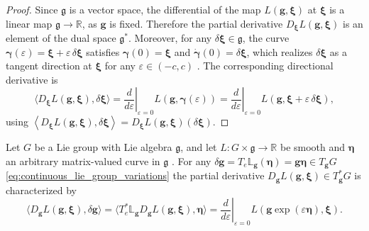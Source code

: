 \begin{proof}
Since $\mathfrak g$ is a vector space, the differential of the map $L(\bm{g},\bm{\xi})$ at $\bm{\xi}$ is a linear map $\mathfrak g\to\mathbb R$, as $\bm{g}$ is fixed. Therefore the partial derivative $D_{\bm{\xi}}L(\bm{g},\bm{\xi})$ is an element of the dual space $\mathfrak g^*$. Moreover, for any $\delta\bm{\xi}\in\mathfrak g$, the curve
$\bm{\gamma}(\varepsilon)=\bm{\xi}+\varepsilon\,\delta\bm{\xi}$ satisfies $\bm{\gamma}(0)=\bm{\xi}$ and $\dot{\bm{\gamma}}(0)=\delta\bm{\xi}$, which realizes $\delta\bm{\xi}$ as a tangent direction at $\bm{\xi}$ for any $\varepsilon \in (-c,c)$ \cite{Lee2008}.
The corresponding directional derivative is
\[
\langle D_{\bm{\xi}} L(\bm{g},\bm{\xi}),\delta\bm{\xi}\rangle
=
\left.\frac{d}{d\varepsilon}\right|_{\varepsilon=0} L(\bm{g},\bm{\gamma}(\varepsilon))
=
\left.\frac{d}{d\varepsilon}\right|_{\varepsilon=0}L(\bm{g},\bm{\xi}+\varepsilon\,\delta\bm{\xi}),
\]
using $\left\langle D_{\bm{\xi}} L(\bm{g},\bm{\xi}),\delta\bm{\xi}\right\rangle
=
D_{\bm{\xi}} L(\bm{g},\bm{\xi})(\delta\bm{\xi})$.
\end{proof}


\begin{proposition}
Let $G$ be a Lie group with Lie algebra $\mathfrak g$, and let $L:G\times\mathfrak g\to\mathbb R$
be smooth and $\bm{\eta}$ an arbitrary matrix-valued curve in $\mathfrak g$ \cite{Hall2000LieGroups}. For any $\delta\bm{g}=T_e\mathbb{L}_{\bm{g}}(\bm{\eta})=\bm{g}\bm{\eta}\in T_{\bm{g}}G$ \eqref{eq:continuous_lie_group_variations}
the partial derivative $D_{\bm{g}} L(\bm{g},\bm{\xi})\in T_{\bm{g}}^*G$ is characterized by
\begin{equation} \label{eq:derivative_rotation}
\langle D_{\bm{g}} L(\bm{g},\bm{\xi}),\delta\bm{g}\rangle
=
\langle T_{e}^{*}\mathbb{L}_{\bm{g}} D_{\bm{g}} L(\bm{g},\bm{\xi}),\bm{\eta} \rangle
=
\left.\frac{d}{d\varepsilon}\right|_{\varepsilon=0}L(\bm{g}\exp{(\varepsilon \bm{\eta})},\bm{\xi}).
\end{equation}
\end{proposition}

